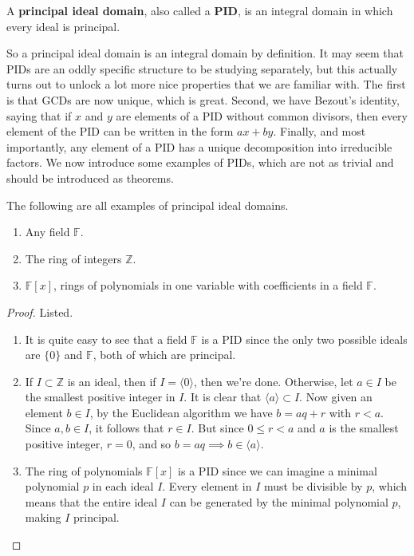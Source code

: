   \begin{definition}
    A \textbf{principal ideal domain}, also called a \textbf{PID}, is an integral domain in which every ideal is principal.  
  \end{definition}

  So a principal ideal domain is an integral domain by definition. It may seem that PIDs are an oddly specific structure to be studying separately, but this actually turns out to unlock a lot more nice properties that we are familiar with. The first is that GCDs are now unique, which is great. Second, we have Bezout's identity, saying that if $x$ and $y$ are elements of a PID without common divisors, then every element of the PID can be written in the form $a x + b y$. Finally, and most importantly, any element of a PID has a unique decomposition into irreducible factors. We now introduce some examples of PIDs, which are not as trivial and should be introduced as theorems. 

  \begin{theorem}
    The following are all examples of principal ideal domains. 
    \begin{enumerate}
      \item Any field $\mathbb{F}$. 
      \item The ring of integers $\mathbb{Z}$. 
      \item $\mathbb{F}[x]$, rings of polynomials in one variable with coefficients in a field $\mathbb{F}$. 
    \end{enumerate}
  \end{theorem}
  \begin{proof}
    Listed. 
    \begin{enumerate}
      \item It is quite easy to see that a field $\mathbb{F}$ is a PID since the only two possible ideals are $\{0\}$ and $\mathbb{F}$, both of which are principal. 
      \item If $I \subset \mathbb{Z}$ is an ideal, then if $I = \langle 0 \rangle$, then we're done. Otherwise, let $a \in I$ be the smallest positive integer in $I$. It is clear that $\langle a \rangle \subset I$. Now given an element $b \in I$, by the Euclidean algorithm we have $b = aq + r$ with $r < a$. Since $a, b \in I$, it follows that $r \in I$. But since $0 \leq r < a$ and $a$ is the smallest positive integer, $r = 0$, and so $b = aq \implies b \in \langle a \rangle$. 
      \item The ring of polynomials $\mathbb{F}[x]$ is a PID since we can imagine a minimal polynomial $p$ in each ideal $I$. Every element in $I$ must be divisible by $p$, which means that the entire ideal $I$ can be generated by the minimal polynomial $p$, making $I$ principal.  
    \end{enumerate}
  \end{proof}

